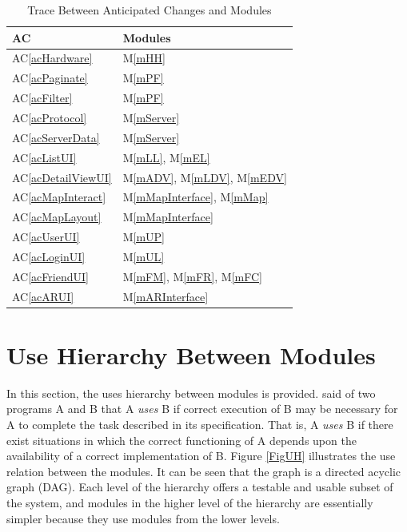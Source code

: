 \documentclass[12pt, titlepage]{article}
\newcommand{\acref}[1]{AC\ref{#1}}
\newcommand{\mref}[1]{M\ref{#1}}
\begin{document}
\begin{table}[H]
\centering
\begin{tabular}{p{} p{}}
\toprule
\textbf{AC} & \textbf{Modules}\\
\midrule
\acref{acHardware} & \mref{mHH}\\
\acref{acPaginate} & \mref{mPF}\\
\acref{acFilter} & \mref{mPF}\\
\acref{acProtocol} & \mref{mServer}\\
\acref{acServerData} & \mref{mServer}\\
\acref{acListUI} & \mref{mLL}, \mref{mEL}\\
\acref{acDetailViewUI} & \mref{mADV}, \mref{mLDV}, \mref{mEDV}\\
\acref{acMapInteract} & \mref{mMapInterface}, \mref{mMap}\\
\acref{acMapLayout} & \mref{mMapInterface}\\
\acref{acUserUI} & \mref{mUP}\\
\acref{acLoginUI} & \mref{mUL}\\
\acref{acFriendUI} & \mref{mFM}, \mref{mFR}, \mref{mFC}\\
\acref{acARUI} & \mref{mARInterface}\\
\bottomrule
\end{tabular}
\caption{Trace Between Anticipated Changes and Modules}
\label{TblACT}
\end{table}

\section{Use Hierarchy Between Modules} \label{SecUse}

In this section, the uses hierarchy between modules is
provided. \citet{Parnas1978} said of two programs A and B that A {\em uses} B if
correct execution of B may be necessary for A to complete the task described in
its specification. That is, A {\em uses} B if there exist situations in which
the correct functioning of A depends upon the availability of a correct
implementation of B.  Figure \ref{FigUH} illustrates the use relation between
the modules. It can be seen that the graph is a directed acyclic graph
(DAG). Each level of the hierarchy offers a testable and usable subset of the
system, and modules in the higher level of the hierarchy are essentially simpler
because they use modules from the lower levels.
\end{document}
